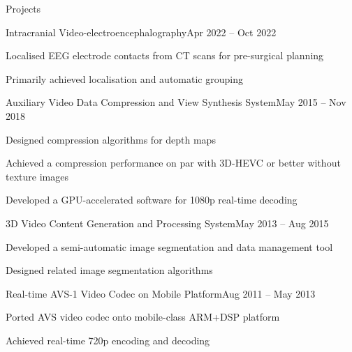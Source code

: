 \documentclass{resume} %
\begin{document}
\begin{rSection}{Projects}

	\begin{rSubsection}{Intracranial Video-electroencephalography}{Apr 2022 -- Oct 2022}{}{}
		\item Localised EEG electrode contacts from CT scans for pre-surgical planning
		\item Primarily achieved localisation and automatic grouping
	\end{rSubsection}

	\begin{rSubsection}{Auxiliary Video Data Compression and View Synthesis System}{May 2015 -- Nov 2018}{}{}
		\item Designed compression algorithms for depth maps
		\item Achieved a compression performance on par with 3D-HEVC or better without texture images
		\item Developed a GPU-accelerated software for 1080p real-time decoding
	\end{rSubsection}
		
	\begin{rSubsection}{3D Video Content Generation and Processing System}{May 2013 -- Aug 2015}{}{}
		\item Developed a semi-automatic image segmentation and data management tool
		\item Designed related image segmentation algorithms
	\end{rSubsection}
		
	\begin{rSubsection}{Real-time AVS-1 Video Codec on Mobile Platform}{Aug 2011 -- May 2013}{}{}
		\item Ported AVS video codec onto mobile-class ARM+DSP platform
		\item Achieved real-time 720p encoding and decoding
	\end{rSubsection}

\end{rSection}


\iffalse
\begin{rSection}{Publications and Patents}

Z. Lin, \textbf{H. Qin} and S. C. Chan, ``A New Probabilistic Representation of Color Image Pixels and Its Applications,'' in \textit{IEEE Transactions on Image Processing}, vol. 28, no. 4, pp. 2037-2050, April 2019.

``A depth discontinuity-based method for efficient intra coding for depth videos'', WO 2017/020808, February 09, 2017.

``Systems and Methods for multiple layer representation of depth map for intra coding'', Hong Kong Short-term Patent Application No. 19124682.6

\end{rSection}
\fi
\end{document}
